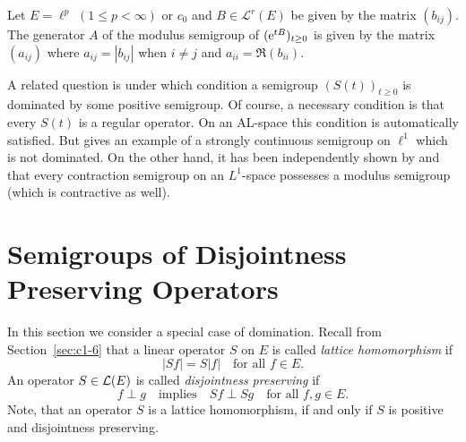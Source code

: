 \begin{example}\label{ex:c2-4.19}
Let $E = \ell^{p}$ $(1 \leq p < \infty)$ or $c_{0}$ and $B \in \mathcal{L}^{r}(E)$ be
given by the matrix $(b_{ij})$.
The generator $A$ of the modulus semigroup of\/ $(\eu^{tB})_{t \geq 0}$ is given by the matrix $(a_{ij})$ where $a_{ij} = |b_{ij}|$ when $i \neq j$ and $a_{ii} = \Re(b_{ii})$.
\end{example}
A related question is under which condition a semigroup $(S(t))_{t \geq 0}$ is
dominated by some positive semigroup.
Of course, a necessary condition is that every $S(t)$ is a regular operator.
On an AL-space this condition is automatically satisfied.
But \textcite{kipnis:1974} gives an example of a strongly continuous semigroup on $\ell^{1}$ which is not dominated.
On the other hand, it has been independently shown by \textcite{kipnis:1974} and
\textcite{kubokawa:1975} that every contraction semigroup on an $L^{1}$-space
possesses a modulus semigroup (which is contractive as well).
\section{Semigroups of Disjointness Preserving Operators} \label{sec:c2-5}%
In this section we consider a special case of domination. 
Recall from Section~\ref{sec:c1-6} 
that a linear operator $S$ on $E$ is called \emph{lattice homomorphism} if
\begin{equation}\label{eq:c2-5.1}
|Sf| = S|f| \quad \text{for all } f \in E.
\end{equation}
An operator $S \in \mathcal{L}(E)$ is called \emph{disjointness preserving} if
\begin{equation}\label{eq:c2-5.2}
f \perp g \quad \text{implies} \quad Sf \perp Sg \quad \text{for all } f,g \in E.
\end{equation}
Note, that an operator $S$ is a lattice homomorphism, if and only if\/ $S$
is positive and disjointness preserving.

